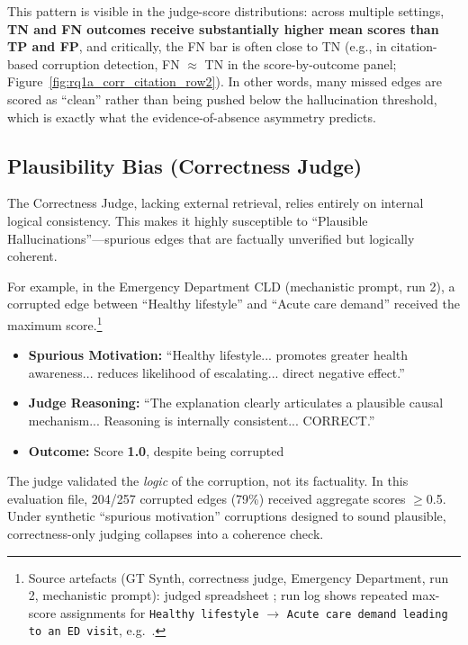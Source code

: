 This pattern is visible in the judge-score distributions: across multiple settings, \textbf{TN and FN outcomes receive substantially higher mean scores than TP and FP}, and critically, the FN bar is often close to TN (e.g., in citation-based corruption detection, FN $\approx$ TN in the score-by-outcome panel; Figure~\ref{fig:rq1a_corr_citation_row2}). In other words, many missed edges are scored as ``clean'' rather than being pushed below the hallucination threshold, which is exactly what the evidence-of-absence asymmetry predicts.

\subsection{Plausibility Bias (Correctness Judge)}

The Correctness Judge, lacking external retrieval, relies entirely on internal logical consistency. This makes it highly susceptible to ``Plausible Hallucinations''---spurious edges that are factually unverified but logically coherent.

For example, in the Emergency Department CLD (mechanistic prompt, run 2), a corrupted edge between ``Healthy lifestyle'' and ``Acute care demand'' received the maximum score.\footnote{Source artefacts (GT Synth, correctness judge, Emergency Department, run 2, mechanistic prompt): judged spreadsheet ; run log shows repeated max-score assignments for \texttt{Healthy lifestyle} $\rightarrow$ \texttt{Acute care demand leading to an ED visit}, e.g.\ .}%
\begin{itemize}[noitemsep]
    \item \textbf{Spurious Motivation:} ``Healthy lifestyle... promotes greater health awareness... reduces likelihood of escalating... direct negative effect.''
    \item \textbf{Judge Reasoning:} ``The explanation clearly articulates a plausible causal mechanism... Reasoning is internally consistent... CORRECT.''
    \item \textbf{Outcome:} Score \textbf{1.0}, despite being corrupted
\end{itemize}

The judge validated the \textit{logic} of the corruption, not its factuality. In this evaluation file, 204/257 corrupted edges (79\%) received aggregate scores $\geq$0.5. Under synthetic ``spurious motivation'' corruptions designed to sound plausible, correctness-only judging collapses into a coherence check.

